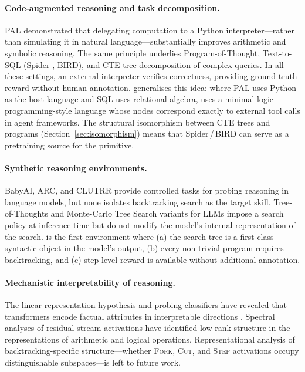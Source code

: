 \paragraph{Code-augmented reasoning and task decomposition.}
PAL \citep{gao2023pal} demonstrated that delegating computation to a Python
interpreter---rather than simulating it in natural language---substantially
improves arithmetic and symbolic reasoning.
The same principle underlies Program-of-Thought, Text-to-SQL (Spider
\citep{yu2018spider}, BIRD), and CTE-tree decomposition of complex queries.
In all these settings, an external interpreter verifies correctness, providing
ground-truth reward without human annotation.
\gore{} generalises this idea: where PAL uses Python as the host language and
SQL uses relational algebra, \gore{} uses a minimal logic-programming-style
language whose \callstmt{} nodes correspond exactly to external tool calls in
agent frameworks.
The structural isomorphism between CTE trees and \gore{} programs
(Section~\ref{sec:isomorphism}) means that Spider\,/\,BIRD can serve as a
pretraining source for the \callstmt{} primitive.

\paragraph{Synthetic reasoning environments.}
BabyAI, ARC, and CLUTRR provide controlled tasks for probing reasoning in
language models, but none isolates backtracking search as the target skill.
Tree-of-Thoughts \citep{yao2024tree} and Monte-Carlo Tree Search variants for
LLMs impose a search policy at inference time but do not modify the model's
internal representation of the search.
\gore{} is the first environment where (a) the search tree is a first-class
syntactic object in the model's output, (b) every non-trivial program requires
backtracking, and (c) step-level reward is available without additional
annotation.

\paragraph{Mechanistic interpretability of reasoning.}
The linear representation hypothesis and probing classifiers have revealed that
transformers encode factual attributes in interpretable directions
\citep{lightman2023lets}.
Spectral analyses of residual-stream activations have identified low-rank
structure in the representations of arithmetic and logical operations.
Representational analysis of backtracking-specific structure---whether \textsc{Fork}, \textsc{Cut},
and \textsc{Step} activations occupy distinguishable subspaces---is left to future work.
